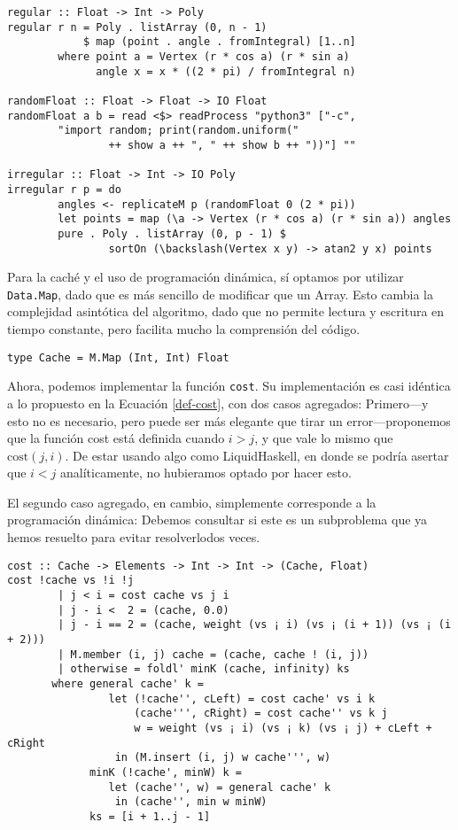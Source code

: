 \documentclass[tiny]{corsage}
\newcommand{\cost}[1]{\text{cost}(#1)}
\theoremstyle{plain}
\theoremstyle{definition}
\begin{document}
	\begin{verbatim}
regular :: Float -> Int -> Poly
regular r n = Poly . listArray (0, n - 1)
	        $ map (point . angle . fromIntegral) [1..n]
        where point a = Vertex (r * cos a) (r * sin a)
              angle x = x * ((2 * pi) / fromIntegral n)

randomFloat :: Float -> Float -> IO Float
randomFloat a b = read <$> readProcess "python3" ["-c",
        "import random; print(random.uniform("
                ++ show a ++ ", " ++ show b ++ "))"] ""

irregular :: Float -> Int -> IO Poly
irregular r p = do
        angles <- replicateM p (randomFloat 0 (2 * pi))
        let points = map (\a -> Vertex (r * cos a) (r * sin a)) angles
        pure . Poly . listArray (0, p - 1) $
                sortOn (\backslash(Vertex x y) -> atan2 y x) points
	\end{verbatim}

	Para la caché y el uso de programación dinámica, sí optamos por utilizar \texttt{Data.Map}, dado que es más sencillo de modificar que un Array.  Esto cambia la complejidad asintótica del algoritmo, dado que no permite lectura y escritura en tiempo constante, pero facilita mucho la comprensión del código.
	\begin{verbatim}
type Cache = M.Map (Int, Int) Float
	\end{verbatim}

	Ahora, podemos implementar la función \texttt{cost}.  Su implementación es casi idéntica a lo propuesto en la Ecuación \ref{def-cost}, con dos casos agregados:  Primero---y esto no es necesario, pero puede ser más elegante que tirar un error---proponemos que la función cost está definida cuando $i > j$, y que vale lo mismo que $\cost{j, i}$.  De estar usando algo como LiquidHaskell, en donde se podría asertar que $i < j$ analíticamente, no hubieramos optado por hacer esto.

	El segundo caso agregado, en cambio, simplemente corresponde a la programación dinámica:  Debemos consultar si este es un subproblema que ya hemos resuelto para evitar resolverlodos veces.

	\begin{verbatim}
cost :: Cache -> Elements -> Int -> Int -> (Cache, Float)
cost !cache vs !i !j
        | j < i = cost cache vs j i
        | j - i <  2 = (cache, 0.0)
        | j - i == 2 = (cache, weight (vs ¡ i) (vs ¡ (i + 1)) (vs ¡ (i + 2)))
        | M.member (i, j) cache = (cache, cache ! (i, j))
        | otherwise = foldl' minK (cache, infinity) ks
       where general cache' k =
                let (!cache'', cLeft) = cost cache' vs i k
                    (cache''', cRight) = cost cache'' vs k j
                    w = weight (vs ¡ i) (vs ¡ k) (vs ¡ j) + cLeft + cRight
                 in (M.insert (i, j) w cache''', w)
             minK (!cache', minW) k =
                let (cache'', w) = general cache' k
                 in (cache'', min w minW)
             ks = [i + 1..j - 1]
	\end{verbatim}
\end{document}
